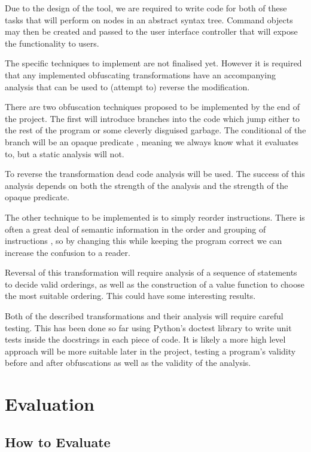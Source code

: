 \documentclass{report}
\begin{document}
Due to the design of the tool, we are required to write code for both of these tasks
that will perform on nodes in an abstract syntax tree. Command objects may then be
created and passed to the user interface controller that will expose the functionality
to users.

The specific techniques to implement are not finalised yet. However it is required that
any implemented obfuscating transformations have an accompanying analysis that can be
used to (attempt to) reverse the modification.

There are two obfuscation techniques proposed to be implemented by the end of the project.
The first will introduce branches into the code which jump either to the rest of the program
or some cleverly disguised garbage. The conditional of the branch will be an opaque predicate
\cite{taxobftrans}, meaning we always know what it evaluates to, but a static analysis will not.

To reverse the transformation dead code analysis will be used. The success of this analysis
depends on both the strength of the analysis and the strength of the opaque predicate.

The other technique to be implemented is to simply reorder instructions. There is often a
great deal of semantic information in the order and grouping of instructions
\cite{taxobftrans}, so by changing this while keeping the program correct we can increase
the confusion to a reader.

Reversal of this transformation will require analysis of a sequence of statements to decide
valid orderings, as well as the construction of a value function to choose the most suitable
ordering. This could have some interesting results.

Both of the described transformations and their analysis will require careful testing. This
has been done so far using Python's doctest library to write unit tests inside the docstrings
in each piece of code. It is likely a more high level approach will be more suitable later in
the project, testing a program's validity before and after obfuscations as well as the validity
of the analysis.

\section{Evaluation}

\subsection{How to Evaluate}
\end{document}
